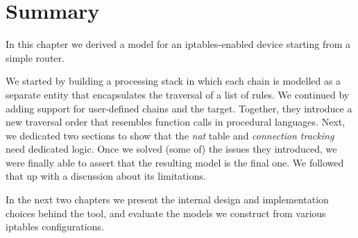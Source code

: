 \section{Summary}
In this chapter we derived a model for an iptables-enabled device starting from
a simple router.

We started by building a processing stack in which each chain is modelled as a
separate entity that encapsulates the traversal of a list of rules.  We
continued by adding support for user-defined chains and the \RETURN target.
Together, they introduce a new traversal order that resembles function calls in
procedural languages.  Next, we dedicated two sections to show that the
\emph{nat} table and \emph{connection tracking} need dedicated logic.  Once we
solved (some of) the issues they introduced, we were finally able to assert
that the resulting model is the final one.  We followed that up with a
discussion about its limitations.

In the next two chapters we present the internal design and implementation
choices behind the \TOOL tool, and evaluate the models we construct from
various iptables configurations.
